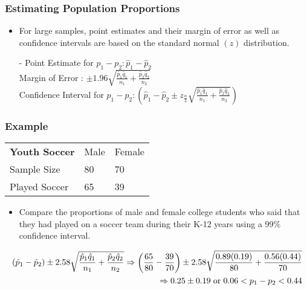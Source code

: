 \documentclass[12pt, letterpaper]{article}
\begin{document}
            \subsubsection{Estimating Population Proportions}
                \begin{itemize}
                    \item For large samples, point estimates and their margin of error as well as confidence intervals are based on the standard normal $(z)$ distribution.
                    \item[-] Point Estimate for $p_1-p_2 : \hat{p}_1-\hat{p}_2$ \\ Margin of Error : $\pm 1.96\sqrt{\frac{\hat{p}_1\hat{q}_1}{n_1} + \frac{\hat{p}_2\hat{q}_2}{n_2}}$ \\ Confidence Interval for $p_1-p_2 : (\hat{p}_1-\hat{p}_2\pm z_{\frac{\alpha}{2}}\sqrt{\frac{\hat{p}_1\hat{q}_1}{n_1} + \frac{\hat{p}_2\hat{q}_2}{n_2}})$
                \end{itemize}
            \newpage\subsubsection*{Example}
                \begin{tabular}{|l|l|l|}
                    \cline{1-3}
                    \textbf{Youth Soccer} & Male & Female \\ \cline{1-3}
                    Sample Size & 80 & 70 \\ \cline{1-3}
                    Played Soccer & 65 & 39 \\ \cline{1-3}
                \end{tabular}
                \begin{itemize}
                    \item Compare the proportions of male and female college students who said that they had played on a soccer team during their K-12 years using a 99\% confidence interval.
                \end{itemize}
                \begin{mdframed}[leftmargin=0.5cm, rightmargin=0.5cm]
                    \begin{align*}
                        (\hat{p}_1 - \hat{p}_2)\pm 2.58\sqrt{\frac{\hat{p}_1\hat{q}_1}{n_1} + \frac{\hat{p}_2\hat{q}_2}{n_2}} \Rightarrow \left(\frac{65}{80} - \frac{39}{70} \right) \pm 2.58\sqrt{\frac{0.89(0.19)}{80} + \frac{0.56(0.44)}{70}} \\ \Rightarrow 0.25\pm 0.19 \hspace{3pt} \textnormal{or} \hspace{3pt} 0.06 < p_1 - p_2 < 0.44                    
                    \end{align*}
                \end{mdframed}
\end{document}
